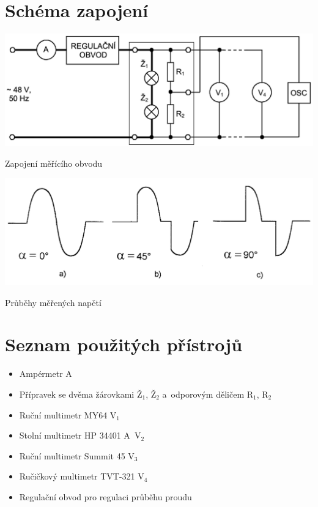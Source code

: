 \documentclass[a4paper,12pt]{article}   %
\begin{document}
\section{Schéma zapojení}
\begin{schema}
    \centering
    \includegraphics[width=.8\textwidth]{schema_zapojeni.png}
    \caption{Zapojení měřícího obvodu \cite{navod}}
    \label{sch:zapojeni}
\end{schema}

\begin{graf}
    \centering
    \includegraphics[width=.7\textwidth]{vlny.png}
    \caption{Průběhy měřených napětí \cite{navod}}
    \label{graf:prubehy}
\end{graf}

\section{Seznam použitých přístrojů}
\begin{itemize}
    \item Ampérmetr A
    \item Přípravek se dvěma žárovkami $\textrm{Ž}_1$, $\textrm{Ž}_2$ a~odporovým děličem $\textrm{R}_1$, $\textrm{R}_2$
    \item Ruční multimetr MY64 $\textrm{V}_1$
    \item Stolní multimetr HP 34401 A~$\textrm{V}_2$
    \item Ruční multimetr Summit 45 $\textrm{V}_3$
    \item Ručičkový multimetr TVT-321 $\textrm{V}_4$
    \item Regulační obvod pro regulaci průběhu proudu
\end{itemize}
\end{document}
